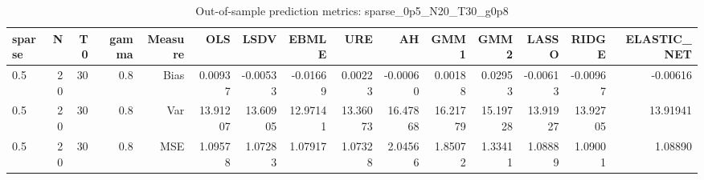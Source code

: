 \begin{table}[!htbp]\centering
\caption{Out-of-sample prediction metrics: sparse_0p5_N20_T30_g0p8}
\label{tab:table3_sparse_0p5_N20_T30_g0p8}
\begin{tabular}{lrrrrrrrrrrrrrr}
\hline
sparse & N & T0 & gamma & Measure & OLS & LSDV & EBMLE & URE & AH & GMM1 & GMM2 & LASSO & RIDGE & ELASTIC_NET \\
\hline
0.5 & 20 & 30 & 0.8 & Bias & 0.00937 & -0.00533 & -0.01669 & 0.00223 & -0.00060 & 0.00188 & 0.02953 & -0.00613 & -0.00967 & -0.00616 \\
0.5 & 20 & 30 & 0.8 & Var & 13.91207 & 13.60905 & 12.97141 & 13.36073 & 16.47868 & 16.21779 & 15.19728 & 13.91927 & 13.92705 & 13.91941 \\
0.5 & 20 & 30 & 0.8 & MSE & 1.09578 & 1.07283 & 1.07917 & 1.07328 & 2.04566 & 1.85072 & 1.33411 & 1.08889 & 1.09001 & 1.08890 \\
\hline
\end{tabular}
\end{table}

